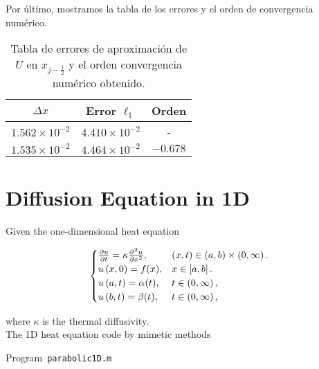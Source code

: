 Por último, mostramos la tabla de los errores y el orden de convergencia numérico.

\begin{table}[ht!]
	\centering
	\begin{tabular}{ccc}
		\toprule
		$\Delta x$            & Error $\ell_1$        & Orden    \\
		\midrule
		$1.562\times 10^{-2}$ & $4.410\times 10^{-2}$ & -        \\
		$1.535\times 10^{-2}$ & $4.464\times 10^{-2}$ & $-0.678$ \\
		\bottomrule
	\end{tabular}
	\caption{Tabla de errores de aproximación de $U$ en
		$x_{j-\frac{1}{2}}$ y el orden convergencia numérico obtenido.}
	\label{table:errors}
\end{table}


\section{Diffusion Equation in 1D}

Given the one-dimensional heat equation

\begin{equation}\label{eq:IBVPheat1d}
	\begin{cases}
		\diffp{u}{t}=
		\kappa\diffp[2]{u}{x},
		                              & \left(x,t\right)\in
		\left(a,b \right)\times\left(0, \infty \right).     \\
		u\left(x,0\right)=f(x),
		                              & x\in
		\left[a,b\right].                                   \\
		u\left(a,t\right)= \alpha(t), & t\in
		\left(0,\infty\right),                              \\
		u\left(b,t\right)= \beta(t),
		                              & t\in
		\left(0,\infty\right),
	\end{cases}
\end{equation}

where $\kappa$ is the thermal diffusivity.\\

The 1D heat equation code by mimetic methods


\begin{listing}[ht!]
	\tiny
	\centering
	\caption{Program~\texttt{parabolic1D.m}}
	\label{code:parabolic1D.m}
\end{listing}


